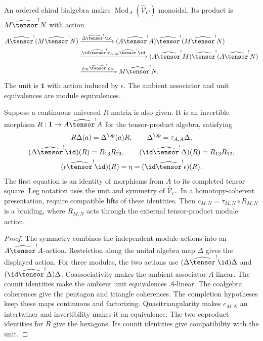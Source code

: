 \begin{theorem}\label{thm:vol4-representation-fusion}
An ordered chiral bialgebra makes
$\operatorname{Mod}_A(\widehat{\mathcal V}_C)$ monoidal.
Its product is $M\widehat{\tensor}^{!}N$ with action
\[
\begin{aligned}
 A\widehat{\tensor}^{!}(M\widehat{\tensor}^{!}N)
 &\xrightarrow{\Delta\widehat{\tensor}^{!}\id}
 (A\widehat{\tensor}^{!}A)\widehat{\tensor}^{!}
 (M\widehat{\tensor}^{!}N)\\
 &\xrightarrow{\id\widehat{\tensor}^{!}\tau_{A,M}
                       \widehat{\tensor}^{!}\id}
 (A\widehat{\tensor}^{!}M)\widehat{\tensor}^{!}
 (A\widehat{\tensor}^{!}N)\\
 &\xrightarrow{\rho_M\widehat{\tensor}^{!}\rho_N}
 M\widehat{\tensor}^{!}N.
\end{aligned}
\]
The unit is $\mathbf1$ with action induced by $\epsilon$.
The ambient associator and unit equivalences are module equivalences.

Suppose a continuous universal $R$-matrix is also given.
It is an invertible morphism
$R:\mathbf1\to A\widehat{\tensor}^{!}A$ for the tensor-product algebra,
satisfying
\[
\begin{gathered}
 R\Delta(a)=\Delta^{\op}(a)R,\qquad
 \Delta^{\op}=\tau_{A,A}\Delta,\\
 (\Delta\widehat{\tensor}^{!}\id)(R)=R_{13}R_{23},
 \qquad
 (\id\widehat{\tensor}^{!}\Delta)(R)=R_{13}R_{12},\\
 (\epsilon\widehat{\tensor}^{!}\id)(R)=\eta
 =(\id\widehat{\tensor}^{!}\epsilon)(R).
\end{gathered}
\]
The first equation is an identity of morphisms from $A$ to its completed tensor square.
Leg notation uses the unit and symmetry of $\widehat{\mathcal V}_C$.
In a homotopy-coherent presentation, require compatible lifts of these identities.
Then $c_{M,N}=\tau_{M,N}\circ R_{M,N}$ is a braiding,
where $R_{M,N}$ acts through the external tensor-product module action.
\end{theorem}
\begin{proof}
The symmetry combines the independent module actions into an
$A\widehat{\tensor}^{!}A$-action.
Restriction along the unital algebra map $\Delta$ gives the displayed action.
For three modules, the two actions use
$(\Delta\widehat{\tensor}^{!}\id)\Delta$ and
$(\id\widehat{\tensor}^{!}\Delta)\Delta$.
Coassociativity makes the ambient associator $A$-linear.
The counit identities make the ambient unit equivalences $A$-linear.
The coalgebra coherences give the pentagon and triangle coherences.
The completion hypotheses keep these maps continuous and factorizing.
Quasitriangularity makes $c_{M,N}$ an intertwiner and invertibility makes it an equivalence.
The two coproduct identities for $R$ give the hexagons.
Its counit identities give compatibility with the unit.
\end{proof}

